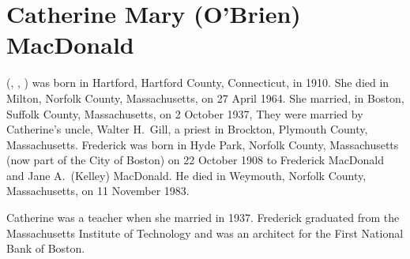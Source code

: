 \section{Catherine Mary (O'Brien) MacDonald}\label{per:Catherine4OBrien}

 (, , ) was born in Hartford, Hartford County, Connecticut, in 1910.\cite{Census1910Edward3OBrien:2} She died in Milton, Norfolk County, Massachusetts, on 27 April 1964.\cite{Catherine4OBrienDeath:1} She married, in Boston, Suffolk County, Massachusetts, on 2 October 1937, \cite{Catherine4OBrienMarriage:2} They were married by Catherine's uncle, Walter H.\ Gill, a priest in Brockton, Plymouth County, Massachusetts.\cite{Catherine4OBrienMarriage2:2} Frederick was born in Hyde Park, Norfolk County, Massachusetts (now part of the City of Boston\cite{HydePark}) on 22 October 1908 to Frederick MacDonald and Jane A.\ (Kelley) MacDonald.\cite{FrederickMacDonaldBirth} He died in Weymouth, Norfolk County, Massachusetts, on 11 November 1983.\cite{FrederickMacDonaldDeath:1}

Catherine was a teacher when she married in 1937.\cite{Catherine4OBrienMarriage2:3} Frederick graduated from the Massachusetts Institute of Technology and was an architect for the First National Bank of Boston.\cite{FrederickMacDonaldDeath:2}
